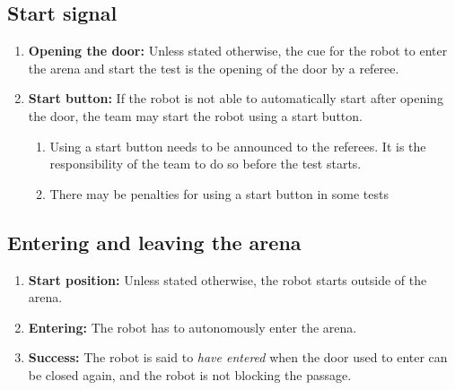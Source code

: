 \subsection{Start signal}
\label{rule:start_signal}

\begin{enumerate}
	\item \textbf{Opening the door:} Unless stated otherwise, the cue for the robot to enter the arena and start the test is the opening of the door by a referee.
	\item \textbf{Start button:} If the robot is not able to automatically start after opening the door, the team may start the robot using a start button. 
	\begin{enumerate}
		\item Using a start button needs to be announced to the referees. It is the responsibility of the team to do so before the test starts.
		\item There may be penalties for using a start button in some tests
	\end{enumerate}
\end{enumerate}


\subsection{Entering and leaving the arena}
\label{rule:start_position}
\begin{enumerate}
	\item \textbf{Start position:} Unless stated otherwise, the robot starts outside of the arena.
	\item \textbf{Entering:} The robot has to autonomously enter the arena.
	\item \textbf{Success:} The robot is said to \emph{have entered} when the door used to enter can be closed again, and the robot is not blocking the passage.
\end{enumerate}



